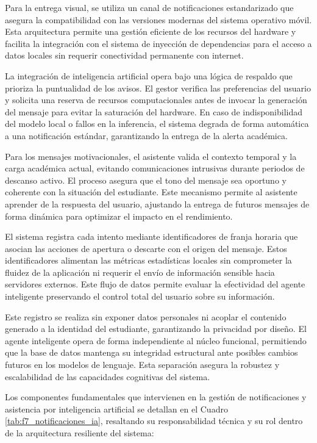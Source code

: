Para la entrega visual, se utiliza un canal de notificaciones estandarizado que asegura la compatibilidad con las versiones modernas del sistema operativo móvil. Esta arquitectura permite una gestión eficiente de los recursos del hardware y facilita la integración con el sistema de inyección de dependencias para el acceso a datos locales sin requerir conectividad permanente con internet.

La integración de inteligencia artificial opera bajo una lógica de respaldo que prioriza la puntualidad de los avisos. El gestor verifica las preferencias del usuario y solicita una reserva de recursos computacionales antes de invocar la generación del mensaje para evitar la saturación del hardware. En caso de indisponibilidad del modelo local o fallos en la inferencia, el sistema degrada de forma automática a una notificación estándar, garantizando la entrega de la alerta académica.

Para los mensajes motivacionales, el asistente valida el contexto temporal y la carga académica actual, evitando comunicaciones intrusivas durante periodos de descanso activo. El proceso asegura que el tono del mensaje sea oportuno y coherente con la situación del estudiante. Este mecanismo permite al asistente aprender de la respuesta del usuario, ajustando la entrega de futuros mensajes de forma dinámica para optimizar el impacto en el rendimiento.

El sistema registra cada intento mediante identificadores de franja horaria que asocian las acciones de apertura o descarte con el origen del mensaje. Estos identificadores alimentan las métricas estadísticas locales sin comprometer la fluidez de la aplicación ni requerir el envío de información sensible hacia servidores externos. Este flujo de datos permite evaluar la efectividad del agente inteligente preservando el control total del usuario sobre su información.

Este registro se realiza sin exponer datos personales ni acoplar el contenido generado a la identidad del estudiante, garantizando la privacidad por diseño. El agente inteligente opera de forma independiente al núcleo funcional, permitiendo que la base de datos mantenga su integridad estructural ante posibles cambios futuros en los modelos de lenguaje. Esta separación asegura la robustez y escalabilidad de las capacidades cognitivas del sistema.

Los componentes fundamentales que intervienen en la gestión de notificaciones y asistencia por inteligencia artificial se detallan en el Cuadro \ref{tab:f7_notificaciones_ia}, resaltando su responsabilidad técnica y su rol dentro de la arquitectura resiliente del sistema:

